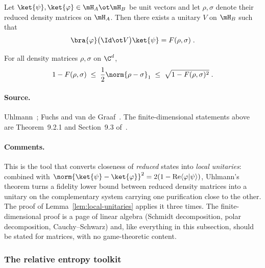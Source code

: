\begin{theorem}[Uhlmann]
\label{thm:uhlmann}
\qlib{}
Let $\ket{\psi}, \ket{\varphi} \in \mH_A \ot \mH_B$ be unit vectors and let $\rho,
\sigma$ denote their reduced density matrices on $\mH_A$. Then there exists a unitary
$V$ on $\mH_B$ such that
\begin{equation*}
  \bra{\varphi} \bigl( \Id \ot V \bigr) \ket{\psi} = F(\rho, \sigma)\;.
\end{equation*}
\end{theorem}

\begin{lemma}
\label{lem:fvdg}
\qlib{}
For all density matrices $\rho, \sigma$ on $\C^d$,
\begin{equation*}
  1 - F(\rho, \sigma) \;\leq\; \frac12 \norm{\rho - \sigma}_1 \;\leq\;
  \sqrt{1 - F(\rho, \sigma)^2}\;.
\end{equation*}
\end{lemma}

\paragraph{Source.} Uhlmann~\cite{Uhl76}; Fuchs and van de Graaf~\cite{FvdG99}. The
finite-dimensional statements above are Theorem~9.2.1 and Section~9.3
of~\cite{Wil13}.

\paragraph{Comments.} This is the tool that converts closeness of \emph{reduced}
states into \emph{local unitaries}: combined with $\norm{\ket{\psi} - \ket{\varphi}}^2
= 2(1 - \mathrm{Re}\langle\varphi|\psi\rangle)$, Uhlmann's theorem turns a fidelity
lower bound between reduced density matrices into a unitary on the complementary
system carrying one purification close to the other. The proof of
Lemma~\ref{lem:local-unitaries} applies it three times. The finite-dimensional proof
is a page of linear algebra (Schmidt decomposition, polar decomposition,
Cauchy--Schwarz) and, like everything in this subsection, should be stated for
matrices, with no game-theoretic content.

\subsubsection{The relative entropy toolkit}
\label{sec:ar-entropy}

\effortMedium\ \qlib

